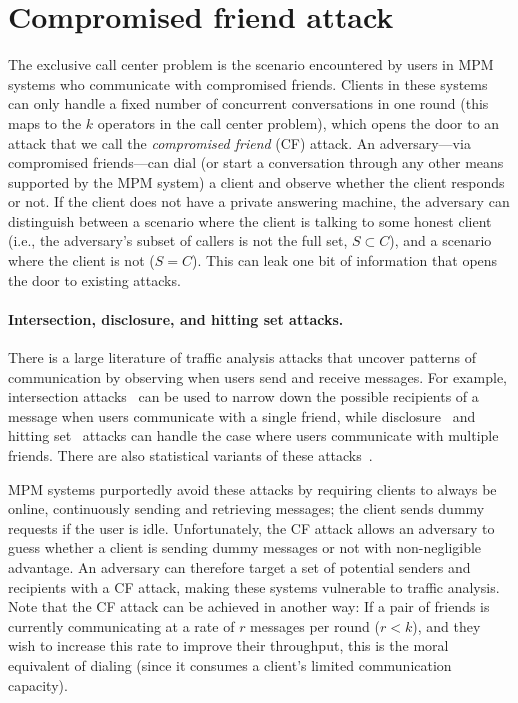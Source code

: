 \section{Compromised friend attack}%
\label{s:attack}

The exclusive call center problem is the scenario encountered by users 
  in MPM systems who communicate with compromised friends.
Clients in these systems can only handle a fixed number of 
  concurrent conversations in one round (this maps to the $k$ operators in 
  the call center problem), which opens the door to an attack
  that we call the \emph{compromised friend} (CF) attack.
An adversary---via compromised friends---can dial (or start a conversation 
  through any other means supported by the MPM system) a 
  client and observe whether the client responds or not.
If the client does not have a private answering machine, 
  the adversary can distinguish between a scenario where
  the client is talking to some honest client (i.e., the adversary's 
  subset of callers is not the full set, $S \subset C$), and a scenario
  where the client is not ($S = C$).
This can leak one bit of information that opens the door to existing attacks.

\paragraph{Intersection, disclosure, and hitting set attacks.}
There is a large literature of traffic analysis attacks that uncover
  patterns of communication by observing when users send and receive messages.
For example, intersection attacks~\cite{raymond00traffic} can be used to 
  narrow down the possible recipients of a message when users communicate
  with a single friend, while disclosure~\cite{agrawal03disclosure} and 
  hitting set~\cite{kesdogan04hitting} attacks can handle the case where 
  users communicate with multiple friends.
There are also statistical variants of these attacks~\cite{danezis03statistical}.

MPM systems purportedly avoid these attacks by requiring clients to always
  be online, continuously sending and retrieving messages; the client sends 
  dummy requests if the user is idle.
Unfortunately, the CF attack allows an adversary to guess whether a client 
  is sending dummy messages or not with non-negligible advantage.
An adversary can therefore target a set of potential senders and
  recipients with a CF attack, making these systems vulnerable to
  traffic analysis.
Note that the CF attack can be achieved in another way:
If a pair of friends is currently communicating at a rate
  of $r$ messages per round ($r < k$), and they wish to increase this
  rate to improve their throughput, this is the moral equivalent of 
  dialing (since it consumes a client's limited communication capacity).

